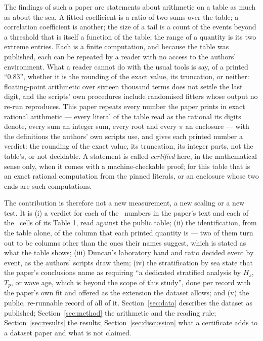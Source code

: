 \documentclass[preprint,11pt,authoryear]{elsarticle}
\begin{document}
The findings of such a paper are statements about arithmetic on a table as much as about the sea. A fitted coefficient is a ratio of two sums over the table; a correlation coefficient is another; the size of a tail is a count of the events beyond a threshold that is itself a function of the table; the range of a quantity is its two extreme entries. Each is a finite computation, and because the table was published, each can be repeated by a reader with no access to the authors' environment. What a reader cannot do with the usual tools is say, of a printed ``0.83'', whether it is the rounding of the exact value, its truncation, or neither: floating-point arithmetic over sixteen thousand terms does not settle the last digit, and the scripts' own procedures include randomised fitters whose output no re-run reproduces. This paper repeats every number the paper prints in exact rational arithmetic --- every literal of the table read as the rational its digits denote, every sum an integer sum, every root and every $\pi$ an enclosure --- with the definitions the authors' own scripts use, and gives each printed number a verdict: the rounding of the exact value, its truncation, its integer parts, not the table's, or not decidable. A statement is called \emph{certified} here, in the mathematical sense only, when it comes with a machine-checkable proof; for this table that is an exact rational computation from the pinned literals, or an enclosure whose two ends are such computations.

The contribution is therefore not a new measurement, a new scaling or a new test. It is (i) a verdict for each of the \ItemsTotal\ numbers in the paper's text and each of the \TOneCells\ cells of its Table 1, read against the public table; (ii) the identification, from the table alone, of the column that each printed quantity is --- two of them turn out to be columns other than the ones their names suggest, which is stated as what the table shows; (iii) Duncan's laboratory band and ratio decided event by event, as the authors' scripts draw them; (iv) the stratification by sea state that the paper's conclusions name as requiring ``a dedicated stratified analysis by $H_s$, $T_p$, or wave age, which is beyond the scope of this study'', done per record with the paper's own fit and offered as the extension the dataset allows; and (v) the public, re-runnable record of all of it. Section~\ref{sec:data} describes the dataset as published; Section~\ref{sec:method} the arithmetic and the reading rule; Section~\ref{sec:results} the results; Section~\ref{sec:discussion} what a certificate adds to a dataset paper and what is not claimed.
\end{document}
